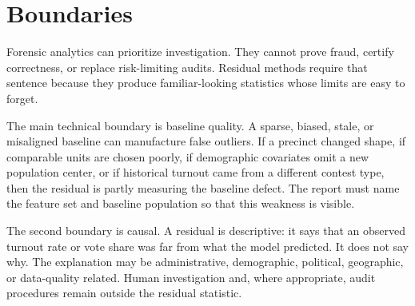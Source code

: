 \section{Boundaries}

Forensic analytics can prioritize investigation. They cannot prove fraud,
certify correctness, or replace risk-limiting audits. Residual methods require
that sentence because they produce familiar-looking statistics whose limits are
easy to forget.

The main technical boundary is baseline quality. A sparse, biased, stale, or
misaligned baseline can manufacture false outliers. If a precinct changed shape,
if comparable units are chosen poorly, if demographic covariates omit a new
population center, or if historical turnout came from a different contest type,
then the residual is partly measuring the baseline defect. The report must name
the feature set and baseline population so that this weakness is visible.

The second boundary is causal. A residual is descriptive: it says that an
observed turnout rate or vote share was far from what the model predicted. It
does not say why. The explanation may be administrative, demographic,
political, geographic, or data-quality related. Human investigation and, where
appropriate, audit procedures remain outside the residual statistic.
